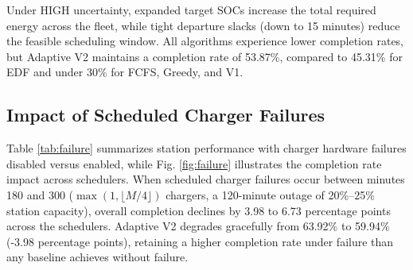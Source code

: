 \documentclass[conference]{IEEEtran}
\begin{document}
Under HIGH uncertainty, expanded target SOCs increase the total required energy across the fleet, while tight departure slacks (down to 15 minutes) reduce the feasible scheduling window. All algorithms experience lower completion rates, but Adaptive V2 maintains a completion rate of 53.87\%, compared to 45.31\% for EDF and under 30\% for FCFS, Greedy, and V1.

\subsection{Impact of Scheduled Charger Failures}
Table \ref{tab:failure} summarizes station performance with charger hardware failures disabled versus enabled, while Fig. \ref{fig:failure} illustrates the completion rate impact across schedulers. When scheduled charger failures occur between minutes 180 and 300 ($\max(1, \lfloor M / 4 \rfloor)$ chargers, a 120-minute outage of 20\%--25\% station capacity), overall completion declines by 3.98 to 6.73 percentage points across the schedulers. Adaptive V2 degrades gracefully from 63.92\% to 59.94\% (-3.98 percentage points), retaining a higher completion rate under failure than any baseline achieves without failure.

\begin{table}[t]
\caption{Performance With and Without Charger Failures}
\label{tab:failure}
\centering
{}
\end{table}
\end{document}
